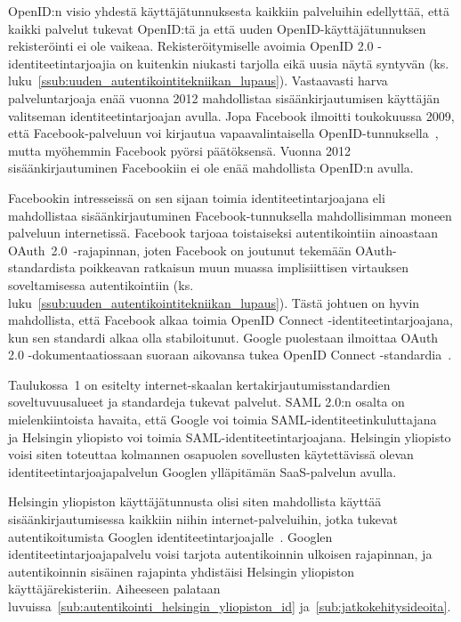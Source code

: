 \documentclass[finnish,gradu]{tktltiki}
\begin{document}

  OpenID:n visio yhdestä käyttäjätunnuksesta kaikkiin palveluihin edellyttää, että kaikki palvelut tukevat OpenID:tä ja että uuden OpenID-käyttäjätunnuksen rekisteröinti ei ole vaikeaa. Rekisteröitymiselle avoimia OpenID 2.0 -identiteetintarjoajia on kuitenkin niukasti tarjolla eikä uusia näytä syntyvän (ks. luku~\ref{ssub:uuden_autentikointitekniikan_lupaus}). Vastaavasti harva palveluntarjoaja enää vuonna 2012 mahdollistaa sisäänkirjautumisen käyttäjän valitseman identiteetintarjoajan avulla. Jopa Facebook ilmoitti toukokuussa 2009, että Facebook-palveluun voi kirjautua vapaavalintaisella OpenID-tun\-nuksel\-la~\cite{facebook_openid_idp}, mutta myöhemmin Facebook pyörsi päätöksensä. Vuonna 2012 sisäänkirjautuminen Facebookiin ei ole enää mahdollista OpenID:n avulla.

  Facebookin intresseissä on sen sijaan toimia identiteetintarjoajana eli mahdollistaa sisäänkirjautuminen Facebook-tunnuksella mahdollisimman moneen palveluun internetissä. Facebook tarjoaa toistaiseksi autentikointiin ainoastaan \mbox{OAuth 2.0 -raja}\-pinnan, joten Facebook on joutunut tekemään OAuth-standardista poikkeavan ratkaisun muun muassa implisiittisen virtauksen soveltamisessa autentikointiin (ks. luku~\ref{ssub:uuden_autentikointitekniikan_lupaus}). Tästä johtuen on hyvin mahdollista, että Facebook alkaa toimia \mbox{OpenID} Connect -identiteetintarjoajana, kun sen standardi alkaa olla stabiloitunut. Google puolestaan ilmoittaa OAuth 2.0 -dokumentaatiossaan suoraan aikovansa tukea \mbox{OpenID} Connect -standardia~\cite{google_oauth2_doc}.

  Taulukossa~1 on esitelty internet-skaalan kertakirjautumisstandardien soveltuvuusalueet ja standardeja tukevat palvelut. SAML 2.0:n osalta on mielenkiintoista havaita, että Google voi toimia SAML-identiteetinkuluttajana~\cite{google_saml_doc} ja Helsingin yliopisto voi toimia SAML-identiteetintarjoajana. Helsingin yliopisto voisi siten toteuttaa kolmannen osapuolen sovellusten käytettävissä olevan identiteetintarjoajapalvelun Googlen ylläpitämän SaaS-palvelun avulla.

  Helsingin yliopiston käyttäjätunnusta olisi siten mahdollista käyttää sisäänkirjautumisessa kaikkiin niihin internet-palveluihin, jotka tukevat autentikoitumista Googlen identiteetintarjoajalle~\cite{google_shibboleth_doc}. Googlen identiteetintarjoajapalvelu voisi tarjota autentikoinnin ulkoisen rajapinnan, ja autentikoinnin sisäinen rajapinta yhdistäisi Helsingin yliopiston käyttäjärekisteriin. Aiheeseen palataan luvuissa~\ref{sub:autentikointi_helsingin_yliopiston_id} ja~\ref{sub:jatkokehitysideoita}.
\end{document}
